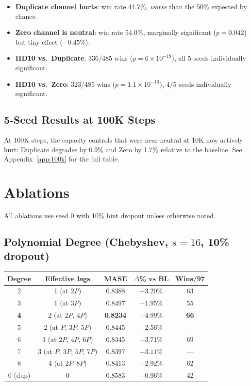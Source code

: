 \documentclass{article}
\begin{document}
\begin{itemize}
    \item \textbf{Duplicate channel hurts}: win rate 44.7\%, \emph{worse} than the 50\% expected by chance.
    \item \textbf{Zero channel is neutral}: win rate 54.0\%, marginally significant ($p = 0.042$) but tiny effect ($-0.45\%$).
    \item \textbf{HD10 vs.\ Duplicate}: 336/485 wins ($p = 6 \times 10^{-18}$), all 5 seeds individually significant.
    \item \textbf{HD10 vs.\ Zero}: 323/485 wins ($p = 1.1 \times 10^{-13}$), 4/5 seeds individually significant.
\end{itemize}

\subsection{5-Seed Results at 100K Steps}

At 100K steps, the capacity controls that were near-neutral at 10K now actively hurt: Duplicate degrades by 0.9\% and Zero by 1.7\% relative to the baseline. See Appendix~\ref{app:100k} for the full table.

\section{Ablations}
\label{app:ablations}

All ablations use seed 0 with 10\% hint dropout unless otherwise noted.

\subsection{Polynomial Degree (Chebyshev, $s=16$, 10\% dropout)}

\begin{table}[h]
\centering
\small
\begin{tabular}{ccccc}
\toprule
\textbf{Degree} & \textbf{Effective lags} & \textbf{MASE} & \textbf{$\Delta$\% vs BL} & \textbf{Wins/97} \\
\midrule
2 & 1 (at $2P$) & 0.8388 & $-3.20\%$ & 63 \\
3 & 1 (at $3P$) & 0.8497 & $-1.95\%$ & 55 \\
\textbf{4} & 2 (at $2P$, $4P$) & \textbf{0.8234} & $\mathbf{-4.99\%}$ & \textbf{66} \\
5 & 2 (at $P$, $3P$, $5P$) & 0.8445 & $-2.56\%$ & --- \\
6 & 3 (at $2P$, $4P$, $6P$) & 0.8345 & $-3.71\%$ & 69 \\
7 & 3 (at $P$, $3P$, $5P$, $7P$) & 0.8397 & $-3.11\%$ & --- \\
8 & 4 (at $2P$--$8P$) & 0.8413 & $-2.92\%$ & 62 \\
0 (dup) & 0 & 0.8583 & $-0.96\%$ & 42 \\
\bottomrule
\end{tabular}
\end{table}
\end{document}
